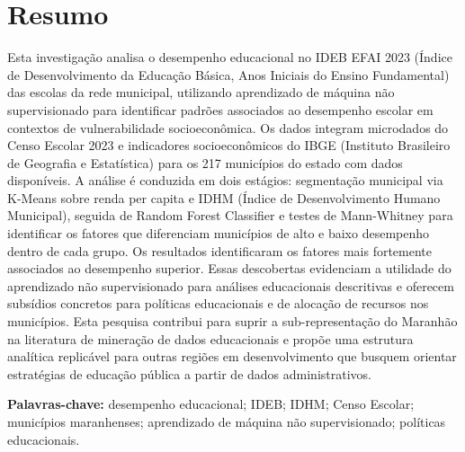 \section*{Resumo}

\noindent
Esta investigação analisa o desempenho educacional no IDEB EFAI 2023 (Índice de Desenvolvimento da Educação Básica, Anos Iniciais do Ensino Fundamental) das escolas da rede municipal, utilizando aprendizado de máquina não supervisionado para identificar padrões associados ao desempenho escolar em contextos de vulnerabilidade socioeconômica. Os dados integram microdados do Censo Escolar 2023 e indicadores socioeconômicos do IBGE (Instituto Brasileiro de Geografia e Estatística) para os 217 municípios do estado com dados disponíveis. A análise é conduzida em dois estágios: segmentação municipal via K-Means sobre renda per capita e IDHM (Índice de Desenvolvimento Humano Municipal), seguida de Random Forest Classifier e testes de Mann-Whitney para identificar os fatores que diferenciam municípios de alto e baixo desempenho dentro de cada grupo. Os resultados identificaram os fatores mais fortemente associados ao desempenho superior. Essas descobertas evidenciam a utilidade do aprendizado não supervisionado para análises educacionais descritivas e oferecem subsídios concretos para políticas educacionais e de alocação de recursos nos municípios. Esta pesquisa contribui para suprir a sub-representação do Maranhão na literatura de mineração de dados educacionais e propõe uma estrutura analítica replicável para outras regiões em desenvolvimento que busquem orientar estratégias de educação pública a partir de dados administrativos.

\medskip
\noindent\textbf{Palavras-chave:} desempenho educacional; IDEB; IDHM; Censo Escolar; municípios maranhenses; aprendizado de máquina não supervisionado; políticas educacionais.